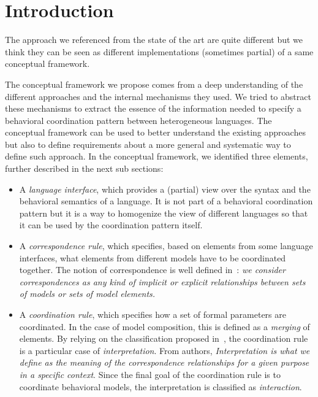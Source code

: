 \section{Introduction}
The approach we referenced from the state of the art are quite different but we think they can be seen as different implementations (sometimes partial) of a same conceptual framework.

The conceptual framework we propose comes from a deep understanding of the different approaches and the internal mechanisms they used. We tried to abstract these mechanisms to extract the essence of the information needed to specify a behavioral coordination pattern between heterogeneous languages. The conceptual framework can be used to better understand the existing approaches but also to define requirements about a more general and systematic way to define such approach. In the conceptual framework, we identified three elements, further described in the next sub sections:  
\begin{itemize}
	\item A \emph{language interface}, which provides a (partial) view over the syntax and the behavioral semantics of a language. It is not part of a behavioral coordination pattern but it is a way to homogenize the view of different languages so that it can be used by the coordination pattern itself.
	\item A \emph{correspondence rule}, which specifies, based on elements from some language interfaces, what elements from different models have to be coordinated together. The notion of correspondence is well defined in~\cite{clavreulmodelcompo}: \emph{we consider correspondences as any kind of implicit or explicit relationships between sets of models or sets of model elements.} 
	
	\item A \emph{coordination rule}, which specifies how a set of formal parameters are coordinated. In the case of model composition, this is defined as a \emph{merging} of elements. By relying on the classification proposed in~\cite{clavreulmodelcompo}, the coordination rule is a particular case of \emph{interpretation}. From authors, \emph{Interpretation is what we define as the meaning of the correspondence relationships for a given purpose in a specific context}. Since the final goal of the coordination rule is to coordinate behavioral models, the interpretation is classified as \emph{interaction}.  
 
\end{itemize}
